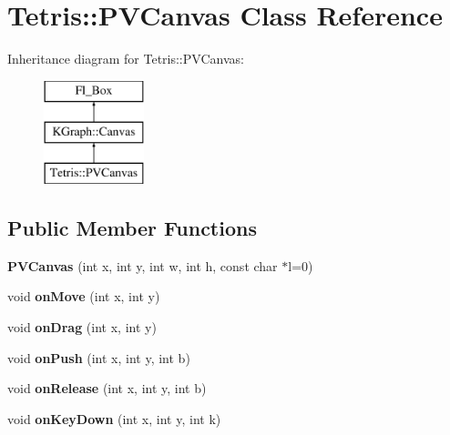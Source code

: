 \hypertarget{class_tetris_1_1_p_v_canvas}{\section{Tetris\-:\-:P\-V\-Canvas Class Reference}
\label{class_tetris_1_1_p_v_canvas}
}
Inheritance diagram for Tetris\-:\-:P\-V\-Canvas\-:\begin{figure}[H]
\begin{center}
\leavevmode
\includegraphics[height=3.000000cm]{class_tetris_1_1_p_v_canvas}
\end{center}
\end{figure}
\subsection*{Public Member Functions}
\begin{DoxyCompactItemize}
\item 
\hypertarget{class_tetris_1_1_p_v_canvas_a9fc62c4882cdf73d03ade0afbdce6077}{{\bfseries P\-V\-Canvas} (int x, int y, int w, int h, const char $\ast$l=0)}\label{class_tetris_1_1_p_v_canvas_a9fc62c4882cdf73d03ade0afbdce6077}

\item 
\hypertarget{class_tetris_1_1_p_v_canvas_ad9ebde55ff948afe38662c1fe3ff4a31}{void {\bfseries on\-Move} (int x, int y)}\label{class_tetris_1_1_p_v_canvas_ad9ebde55ff948afe38662c1fe3ff4a31}

\item 
\hypertarget{class_tetris_1_1_p_v_canvas_a4dd4477abfb914f2d6fb064560a4caa4}{void {\bfseries on\-Drag} (int x, int y)}\label{class_tetris_1_1_p_v_canvas_a4dd4477abfb914f2d6fb064560a4caa4}

\item 
\hypertarget{class_tetris_1_1_p_v_canvas_af6975af5c1557bd019537a75f1eefb36}{void {\bfseries on\-Push} (int x, int y, int b)}\label{class_tetris_1_1_p_v_canvas_af6975af5c1557bd019537a75f1eefb36}

\item 
\hypertarget{class_tetris_1_1_p_v_canvas_ab141246df93f22486a4326891c93871b}{void {\bfseries on\-Release} (int x, int y, int b)}\label{class_tetris_1_1_p_v_canvas_ab141246df93f22486a4326891c93871b}

\item 
\hypertarget{class_tetris_1_1_p_v_canvas_a501b61a67c2b75f1e7095c6552f29e8a}{void {\bfseries on\-Key\-Down} (int x, int y, int k)}\label{class_tetris_1_1_p_v_canvas_a501b61a67c2b75f1e7095c6552f29e8a}

\end{DoxyCompactItemize}
